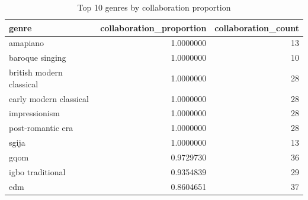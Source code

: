 \documentclass{article}
\begin{document}
\begin{table}[H]
    \centering
    \begin{tabular}[t]{lrr}
        \toprule
        genre                    & collaboration\_proportion & collaboration\_count \\
        \midrule
        amapiano                 & 1.0000000                 & 13                   \\
        baroque singing          & 1.0000000                 & 10                   \\
        british modern classical & 1.0000000                 & 28                   \\
        early modern classical   & 1.0000000                 & 28                   \\
        impressionism            & 1.0000000                 & 28                   \\
        post-romantic era        & 1.0000000                 & 28                   \\
        sgija                    & 1.0000000                 & 13                   \\
        gqom                     & 0.9729730                 & 36                   \\
        igbo traditional         & 0.9354839                 & 29                   \\
        edm                      & 0.8604651                 & 37                   \\
        \bottomrule
    \end{tabular}
    \caption{Top 10 genres by collaboration proportion}\label{tab:top_collab_genres}
\end{table}
\end{document}
